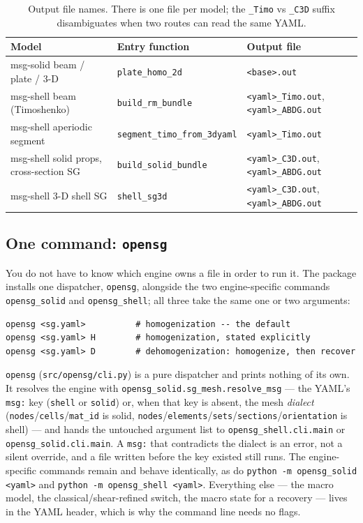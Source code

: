 \begin{table}[htbp]
\centering
\caption{Output file names. There is one file per model; the \texttt{\_Timo} vs
\texttt{\_C3D} suffix disambiguates when two routes can read the same YAML.}
\label{tab:outfiles}
\small
\begin{tabular}{@{}llp{5.2cm}@{}}
\toprule
Model & Entry function & Output file \\
\midrule
msg-solid beam / plate / 3-D & \texttt{plate\_homo\_2d} & \texttt{<base>.out} \\
msg-shell beam (Timoshenko)  & \texttt{build\_rm\_bundle} & \texttt{<yaml>\_Timo.out}, \texttt{<yaml>\_ABDG.out} \\
msg-shell aperiodic segment  & \texttt{segment\_timo\_from\_3dyaml} & \texttt{<yaml>\_Timo.out} \\
msg-shell solid props, cross-section SG & \texttt{build\_solid\_bundle} & \texttt{<yaml>\_C3D.out}, \texttt{<yaml>\_ABDG.out} \\
msg-shell 3-D shell SG       & \texttt{shell\_sg3d} & \texttt{<yaml>\_C3D.out}, \texttt{<yaml>\_ABDG.out} \\
\bottomrule
\end{tabular}
\end{table}

\subsection{One command: \texttt{opensg}}
\label{sec:opensg-cli}

You do not have to know which engine owns a file in order to run it. The
package installs one dispatcher, \texttt{opensg}, alongside the two
engine-specific commands \texttt{opensg\_solid} and \texttt{opensg\_shell};
all three take the same one or two arguments:

\begin{lstlisting}[style=shellst]
opensg <sg.yaml>          # homogenization -- the default
opensg <sg.yaml> H        # homogenization, stated explicitly
opensg <sg.yaml> D        # dehomogenization: homogenize, then recover
\end{lstlisting}

\noindent
\texttt{opensg} (\texttt{src/opensg/cli.py}) is a pure dispatcher and prints
nothing of its own. It resolves the engine with
\texttt{opensg\_solid.sg\_mesh.resolve\_msg} --- the YAML's \texttt{msg:} key
(\texttt{shell} or \texttt{solid}) or, when that key is absent, the mesh
\emph{dialect} (\texttt{nodes}/\texttt{cells}/\texttt{mat\_id} is solid,
\texttt{nodes}/\texttt{elements}/\texttt{sets}/\texttt{sections}/\texttt{orientation}
is shell) --- and hands the untouched argument list to
\texttt{opensg\_shell.cli.main} or \texttt{opensg\_solid.cli.main}. A
\texttt{msg:} that contradicts the dialect is an error, not a silent
override, and a file written before the key existed still runs. The
engine-specific commands remain and behave identically, as do
\texttt{python -m opensg\_solid <yaml>} and
\texttt{python -m opensg\_shell <yaml>}. Everything else --- the macro
model, the classical/shear-refined switch, the macro state for a recovery
--- lives in the YAML header, which is why the command line needs no flags.

